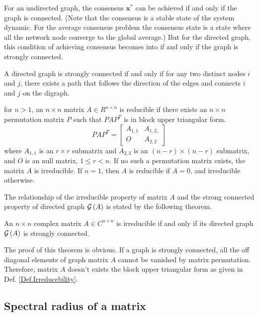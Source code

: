 For an undirected graph, the consensus $\mathbf{x}^{*}$ can be achieved
if and only if the graph is connected. (Note that the consensus is
a stable state of the system dynamic. For the average consensus problem
the consensus state is a state where all the network node converge
to the global average.) But for the directed graph, this condition
of achieving consensus becomes into if and only if the graph is strongly
connected. 

A directed graph is strongly connected if and only if for any two
distinct nodes $i$ and $j$, there exists a path that follows the
direction of the edges and connects $i$ and $j$ on the digraph. 
\begin{defn}
\label{Def.Irreducebility}for $n>1$, an $n\times n$ matrix $A\in R^{n\times n}$
is reducible if there exists an $n\times n$ permutation matrix $P$
such that $PAP^{T}$ is in block upper triangular form. 
\begin{equation}
PAP^{T}=\left[\begin{array}{cc}
A_{1,1} & A_{1,2,}\\
O & A_{2,2}
\end{array}\right]
\end{equation}
where $A_{1,1}$ is an $r\times r$ submatrix and $A_{2,2}$ is an
$\left(n-r\right)\times\left(n-r\right)$ submatrix, and $O$ is an
null matrix, $1\leq r<n$. If no such a permutation matrix exists,
the matrix $A$ is irreducible. If $n=1$, then $A$ is reducible
if $A=0$, and irreducible otherwise. 
\end{defn}
The relationship of the irreducible property of matrix $A$ and the
strong connected property of directed graph ${\cal G}\left(A\right)$
is stated by the following theorem.
\begin{thm}
An $n\times n$ complex matrix $A\in C^{n\times n}$ is irreducible
if and only if its directed graph ${\cal G}\left(A\right)$ is strongly
connected. \cite{Varga2010}
\end{thm}
The proof of this theorem is obvious. If a graph is strongly connected,
all the off diagonal elements of graph matrix $A$ cannot be vanished
by matrix permutation. Therefore, matrix $A$ doesn't exists the block
upper triangular form as given in Def. \ref{Def.Irreducebility}. 


\subsection{Spectral radius of a matrix}

